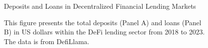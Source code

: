 \setcounter{figure}{0}

\clearpage
\newpage
\begin{figure}[ht!]
\centering
\caption{Deposits and Loans in Decentralized Financial Lending Markets}\label{fig:defi}
\caption*{This figure presents the total deposits (Panel A) and loans (Panel B) in US dollars within the DeFi lending sector from 2018 to 2023. The data is from DefiLlama. }



\end{figure}

